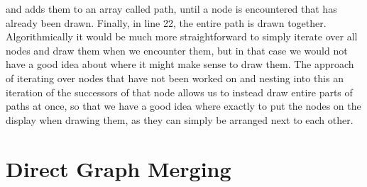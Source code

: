\documentclass[a4paper,12pt,twoside,BCOR=10mm]{scrbook}
\begin{document}
and adds them to an array called path, until a node is encountered that has already been drawn. 
Finally, in line 22, the entire path is drawn together. \\
Algorithmically it would be much more straightforward to simply iterate over all nodes 
and draw them when we encounter them, but in that case we would not have a good idea about 
where it might make sense to draw them. The approach of iterating over nodes 
that have not been worked on and nesting into this an iteration of the successors of that node 
allows us to instead draw entire parts of paths at once, so that we have a good idea 
where exactly to put the nodes on the display when drawing them, as they can simply 
be arranged next to each other.

\section{Direct Graph Merging}
\label{sec:direct_graph_merging}
\end{document}
